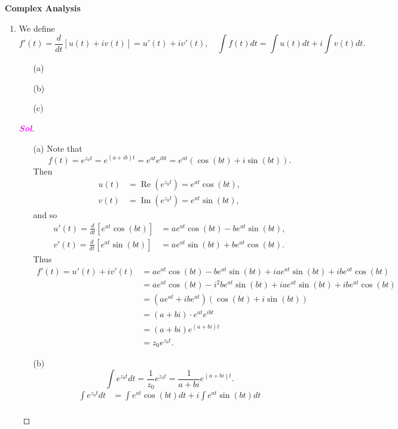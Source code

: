 \documentclass{article}
\theoremstyle{definition}
\newcommand{\of}[1]{\left( #1 \right)}
\newcommand{\sol}{\textcolor{magenta}{\bf Sol}}
\renewcommand{\Re}{\operatorname{Re}}
\renewcommand{\Im}{\operatorname{Im}}
\begin{document}
	\begin{center}
		\huge\textbf{Complex Analysis}\\
		\vspace{0.5em}
	\end{center}
	
	\begin{enumerate}
		\item We define \[
		f'\of{t}=\frac{d}{dt}\left[u\of{t}+iv\of{t}\right] = u'\of{t}+iv'\of{t},\quad
		\int f\of{t}dt = \int u\of{t}dt + i\int v\of{t}dt.
		\] \begin{itemize}
			\item[(a)]
			\item[(b)]
			\item[(c)]
		\end{itemize}
		\begin{proof}[\sol]
			\begin{itemize}
				\item[(a)] Note that \[
				f\of{t}=e^{z_0t}=e^{\of{a+ib}t}=e^{at}e^{i bt}=e^{at}\of{\cos\of{bt}+i\sin\of{bt}}.
				\] Then \begin{align*}
					u\of{t} &=\Re\of{e^{z_0t}}=e^{at}\cos\of{bt},\\
					v\of{t} &=\Im\of{e^{z_0t}}=e^{at}\sin\of{bt},
				\end{align*} and so \begin{align*}
					u'\of{t}=\frac{d}{dt}\left[e^{at}\cos\of{bt}\right]&=ae^{at}\cos\of{bt}-be^{at}\sin\of{bt},\\
					v'\of{t}=\frac{d}{dt}\left[e^{at}\sin\of{bt}\right]&=ae^{at}\sin\of{bt}+be^{at}\cos\of{bt}.
				\end{align*} Thus \begin{align*}
				f'\of{t}=u'\of{t}+iv'\of{t}&=ae^{at}\cos\of{bt}-be^{at}\sin\of{bt}+iae^{at}\sin\of{bt}+ibe^{at}\cos\of{bt}\\
				&=ae^{at}\cos\of{bt}-i^2be^{at}\sin\of{bt}+iae^{at}\sin\of{bt}+ibe^{at}\cos\of{bt}\\
				&=(ae^{at}+ibe^{at})\of{\cos\of{bt}+i\sin\of{bt}}\\
				&=\of{a+bi}\cdot e^{at}e^{ibt}\\
				&=\of{a+bi}e^{\of{a+bi}t}\\
				&=z_0e^{z_0t}.
				\end{align*}
				\item[(b)] \[
				\int e^{z_0t}dt = \frac{1}{z_0}e^{z_0t}=\frac{1}{a+bi}e^{\of{a+bi}t}.
				\]\begin{align*}
					\int e^{z_0t}dt&=\int e^{at}\cos\of{bt}dt +i\int e^{at}\sin\of{bt}dt\\

\end{align*}
\end{itemize}
\end{proof}
\end{enumerate}
\end{document}
